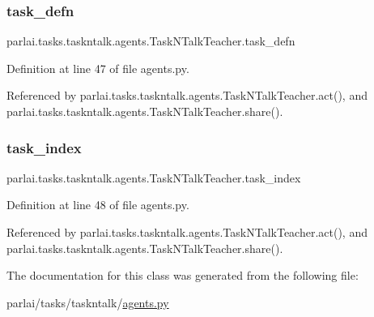 \subsubsection{\texorpdfstring{task\+\_\+defn}{task\_defn}}
{\footnotesize\ttfamily parlai.\+tasks.\+taskntalk.\+agents.\+Task\+N\+Talk\+Teacher.\+task\+\_\+defn}



Definition at line 47 of file agents.\+py.



Referenced by parlai.\+tasks.\+taskntalk.\+agents.\+Task\+N\+Talk\+Teacher.\+act(), and parlai.\+tasks.\+taskntalk.\+agents.\+Task\+N\+Talk\+Teacher.\+share().

\mbox{\label{classparlai_1_1tasks_1_1taskntalk_1_1agents_1_1TaskNTalkTeacher_acbb45bff370bad783084168e46522bf5}} 
\subsubsection{\texorpdfstring{task\+\_\+index}{task\_index}}
{\footnotesize\ttfamily parlai.\+tasks.\+taskntalk.\+agents.\+Task\+N\+Talk\+Teacher.\+task\+\_\+index}



Definition at line 48 of file agents.\+py.



Referenced by parlai.\+tasks.\+taskntalk.\+agents.\+Task\+N\+Talk\+Teacher.\+act(), and parlai.\+tasks.\+taskntalk.\+agents.\+Task\+N\+Talk\+Teacher.\+share().



The documentation for this class was generated from the following file\+:\begin{DoxyCompactItemize}
\item 
parlai/tasks/taskntalk/\hyperlink{parlai_2tasks_2taskntalk_2agents_8py}{agents.\+py}\end{DoxyCompactItemize}
